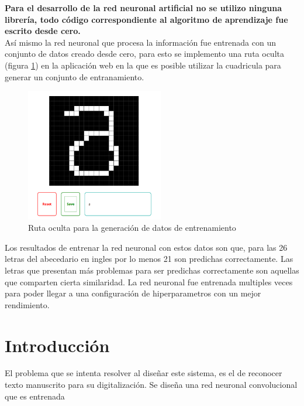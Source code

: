 \documentclass{article}
\begin{document}
\textbf{Para el desarrollo de la red neuronal artificial no se utilizo ninguna librería, todo código correspondiente al algoritmo de aprendizaje fue escrito desde cero.} \\
Así mismo la red neuronal que procesa la información fue entrenada con un conjunto de datos creado desde cero, para esto se implemento una ruta oculta (figura \ref{trainer}) en la aplicación web en la que es posible utilizar la cuadricula para generar 
un conjunto de entranamiento.
\begin{figure}[H]
    \centering
    \includegraphics[width=60mm]{trainer.png}
    \caption{Ruta oculta para la generación de datos de entrenamiento}
    \label{trainer}
\end{figure}
Los resultados de entrenar la red neuronal con estos datos son que, para las 26 letras del abecedario en ingles por lo menos 21 son predichas correctamente. Las letras que presentan más problemas para ser predichas correctamente son aquellas que 
comparten cierta similaridad. La red neuronal fue entrenada multiples veces para poder llegar a una configuración de hiperparametros con un mejor rendimiento. 

\section{Introducción}
El problema que se intenta resolver al diseñar este sistema, es el de reconocer texto manuscrito para su digitalización. 
Se diseña una red neuronal convolucional que es entrenada 
\end{document}

